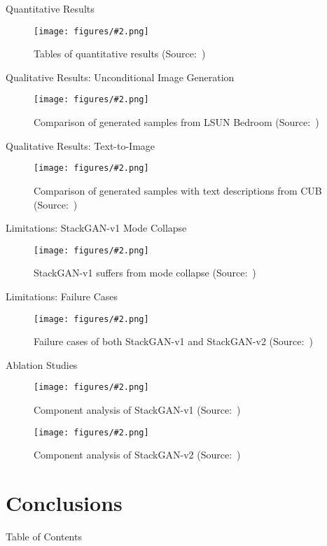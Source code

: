 \documentclass{beamer}
\newcommand{\paperfigure}[3][width=\textwidth]{%
    \begin{figure}%
        \centering%
        \texttt{[image: figures/\#2.png]}%
        \caption{#3 (Source:~\cite{stackgan++})}%
    \end{figure}%
}
\begin{document}

\begin{frame}{Quantitative Results}
    \paperfigure[width=\textwidth]{quantitative_results}{Tables of quantitative results}
\end{frame}

\begin{frame}{Qualitative Results: Unconditional Image Generation}
    \paperfigure[width=\textwidth]{qualitative_results_unconditional}{Comparison of generated samples from LSUN Bedroom}
\end{frame}

\begin{frame}{Qualitative Results: Text-to-Image}
    \paperfigure[width=0.9\textwidth]{qualitative_results_conditional}{Comparison of generated samples with text descriptions from CUB}
\end{frame}

\begin{frame}{Limitations: StackGAN-v1 Mode Collapse}
    \paperfigure[width=\textwidth]{mode_collapse}{StackGAN-v1 suffers from mode collapse}
\end{frame}

\begin{frame}{Limitations: Failure Cases}
    \paperfigure[width=\textwidth]{failure_cases}{Failure cases of both StackGAN-v1 and StackGAN-v2}
\end{frame}

\begin{frame}{Ablation Studies}
    \paperfigure[width=0.5\textwidth]{ablation_v1}{Component analysis of StackGAN-v1}
    \paperfigure[width=0.9\textwidth]{ablation_v2}{Component analysis of StackGAN-v2}
\end{frame}


\section{Conclusions}
\begin{frame}{Table of Contents}
    \tableofcontents[currentsection]
\end{frame}
\end{document}
